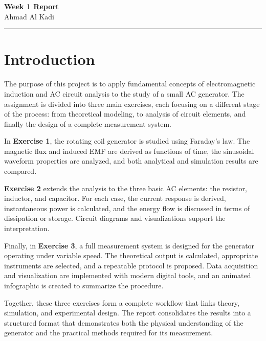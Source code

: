 \documentclass{article}
\begin{document}
\begin{center}
\Large \textbf{Week 1 Report} \\
\large Ahmad Al Kadi
\end{center}
\vspace{0.25em}\hrule\vspace{1.0em}



\section{Introduction}

The purpose of this project is to apply fundamental concepts of
electromagnetic induction and AC circuit analysis to the study of a small AC
generator. The assignment is divided into three main exercises, each focusing
on a different stage of the process: from theoretical modeling, to analysis of
circuit elements, and finally the design of a complete measurement system.

\vspace{0.5cm}

In \textbf{Exercise 1}, the rotating coil generator is studied using
Faraday’s law. The magnetic flux and induced EMF are derived as functions of
time, the sinusoidal waveform properties are analyzed, and both analytical and
simulation results are compared.

\vspace{0.5cm}


\textbf{Exercise 2} extends the analysis to the three basic AC elements: the
resistor, inductor, and capacitor. For each case, the current response is
derived, instantaneous power is calculated, and the energy flow is discussed in
terms of dissipation or storage. Circuit diagrams and visualizations support
the interpretation.

\vspace{0.5cm}

Finally, in \textbf{Exercise 3}, a full measurement system is designed for the
generator operating under variable speed. The theoretical output is calculated,
appropriate instruments are selected, and a repeatable protocol is proposed.
Data acquisition and visualization are implemented with modern digital tools,
and an animated infographic is created to summarize the procedure.


\vspace{0.5cm}

Together, these three exercises form a complete workflow that links theory,
simulation, and experimental design. The report consolidates the results into a
structured format that demonstrates both the physical understanding of the
generator and the practical methods required for its measurement.
\end{document}
